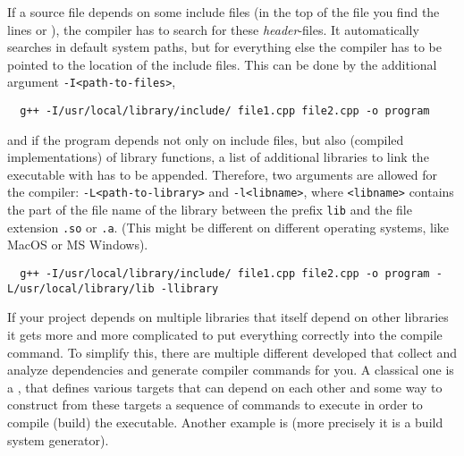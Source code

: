 If a source file depends on some include files (in the top of the file you find the lines  or ), the compiler has to search for these \textit{header}-files. It automatically searches in default system paths, but for everything else the compiler has to be pointed to the location of the include files. This can be done by the additional argument \texttt{-I<path-to-files>}, \eg
%
\begin{verbatim}
  g++ -I/usr/local/library/include/ file1.cpp file2.cpp -o program
\end{verbatim}
%
and if the program depends not only on include files, but also  (compiled implementations) of library functions, a list of additional libraries to link the executable with has to be appended. Therefore, two arguments are allowed for the compiler: \texttt{-L<path-to-library>} and \texttt{-l<libname>}, where \texttt{<libname>} contains the part of the file name of the library between the prefix \texttt{lib} and the file extension \texttt{.so} or \texttt{.a}. (This might be different on different operating systems, like MacOS or MS Windows).
%
\begin{verbatim}
  g++ -I/usr/local/library/include/ file1.cpp file2.cpp -o program -L/usr/local/library/lib -llibrary
\end{verbatim}
%

If your project depends on multiple libraries that itself depend on other libraries it gets more and more complicated to put everything correctly into the compile command. To simplify this, there are multiple different  developed that collect and analyze dependencies and generate compiler commands for you. A classical one is a , that defines various targets that can depend on each other and some way to construct from these targets a sequence of commands to execute in order to compile (build) the executable. Another example is  (more precisely it is a build system generator).

